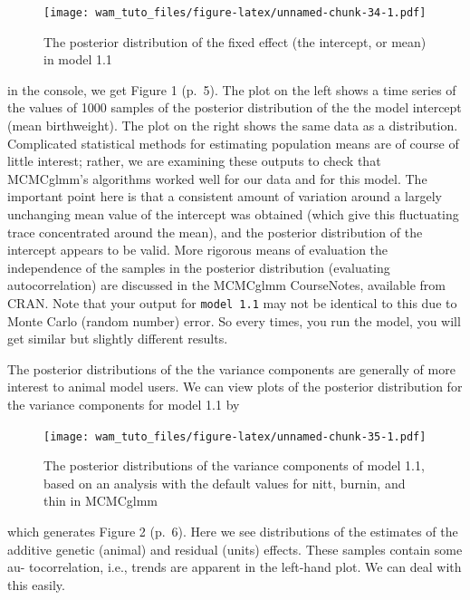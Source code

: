 \documentclass[
  12pt,
]{book}
\newenvironment{Shaded}{\begin{snugshade}}{\end{snugshade}}
\newcommand{\FloatTok}[1]{\textcolor[rgb]{0.00,0.00,0.81}{#1}}
\newcommand{\FunctionTok}[1]{\textcolor[rgb]{0.00,0.00,0.00}{#1}}
\newcommand{\NormalTok}[1]{#1}
\newcommand{\SpecialCharTok}[1]{\textcolor[rgb]{0.00,0.00,0.00}{#1}}
\begin{document}
\begin{figure}
\centering
\texttt{[image: wam\_tuto\_files/figure-latex/unnamed-chunk-34-1.pdf]}
\caption{\label{fig:unnamed-chunk-34}The posterior distribution of the fixed effect (the intercept, or mean) in model 1.1}
\end{figure}

in the console, we get Figure 1 (p.~5). The plot on the left shows a time series of the values of 1000 samples of the posterior distribution of the the model intercept (mean birthweight). The plot on the right shows the same data as a distribution. Complicated statistical methods for estimating population means are of course of little interest; rather, we are examining these outputs to check that MCMCglmm's algorithms worked well for our data and for this model. The important point here is that a consistent amount of variation around a largely unchanging mean value of the intercept was obtained (which give this fluctuating trace concentrated around the mean), and the posterior distribution of the intercept appears to be valid. More rigorous means of evaluation the independence of the samples in the posterior distribution (evaluating autocorrelation) are discussed in the MCMCglmm CourseNotes, available from CRAN. Note that your output for \texttt{model\ 1.1} may not be identical to this due to Monte Carlo (random number) error. So every times, you run the model, you will get similar but slightly different results.

The posterior distributions of the the variance components are generally of more interest to animal model users. We can view plots of the posterior distribution for the variance components for model 1.1 by

\begin{Shaded}
\end{Shaded}

\begin{figure}
\centering
\texttt{[image: wam\_tuto\_files/figure-latex/unnamed-chunk-35-1.pdf]}
\caption{\label{fig:unnamed-chunk-35}The posterior distributions of the variance components of model 1.1, based on an analysis with the default values for nitt, burnin, and thin in MCMCglmm}
\end{figure}

which generates Figure 2 (p.~6). Here we see distributions of the estimates of the additive genetic (animal) and residual (units) effects. These samples contain some au- tocorrelation, i.e., trends are apparent in the left-hand plot. We can deal with this easily.
\end{document}
